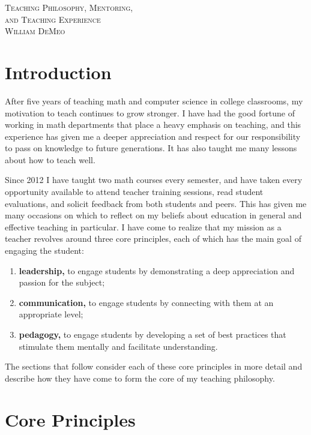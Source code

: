 \begin{center}
 {\large {\scshape Teaching Philosophy, Mentoring,}}\\ {\large {\scshape and Teaching Experience}}\\[5pt]
  {\scshape William DeMeo}
\end{center}
\thispagestyle{empty}


\section{Introduction}
After five years of teaching math and computer science in college classrooms, my motivation
to teach continues to grow stronger. I have had the good fortune of working in math departments
that place a heavy emphasis on teaching, and this experience has given me 
a deeper appreciation and respect for our responsibility to pass on knowledge to
future generations. It has also taught me many lessons about how to teach well.
 
Since 2012 I have taught two math courses every semester, and have
taken every opportunity available to attend teacher
training sessions, read student evaluations, and solicit feedback from
both students and peers.  This has given me many occasions on which to
reflect on my beliefs about education in general and effective
teaching in particular.  I have come to realize that my mission as a
teacher revolves around three core principles, each of which has the
main goal of engaging the student:
\begin{enumerate}
\item {\bf leadership,} to engage students by
  demonstrating a deep appreciation and passion for the subject;
\item {\bf communication,} to engage students by connecting with them
  at an appropriate level;
\item {\bf pedagogy,} to engage students by developing a set of best
  practices that stimulate them mentally and facilitate
  understanding.
\end{enumerate}

The sections that follow consider each of these core
principles in more detail and describe how they have come to form the
 core of my teaching philosophy.


 \bigskip

 \section{Core Principles}

